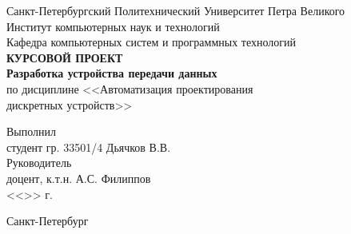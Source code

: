 \begin{titlepage}
\begin{center}
	Санкт-Петербургский Политехнический Университет Петра Великого\\[3mm]
	Институт компьютерных наук и технологий \\[3mm]
	Кафедра компьютерных систем и программных технологий\\[6cm]
	
	\textbf{КУРСОВОЙ ПРОЕКТ}\\[3mm]
	\textbf{Разработка устройства передачи данных}\\[3mm]
	по дисциплине <<Автоматизация проектирования\\[3mm] 
	дискретных устройств>>\\[6cm]
\end{center}

\begin{flushleft}
	Выполнил\\[3mm]
	студент гр. 33501/4  \hspace*{7.1cm} Дьячков В.В.\\[3mm]
	Руководитель\\[3mm]
	доцент, к.т.н. \hspace*{8.5cm} А.С. Филиппов\\[4mm]
	\hspace*{11.5cm} <<\sign[7mm]>> \sign[20mm] \the\year\hspace{1mm} г.
\end{flushleft}

\vfill

\begin{center}
	Санкт-Петербург\\
	\the\year
\end{center}
\end{titlepage}

\addtocounter{page}{1}
